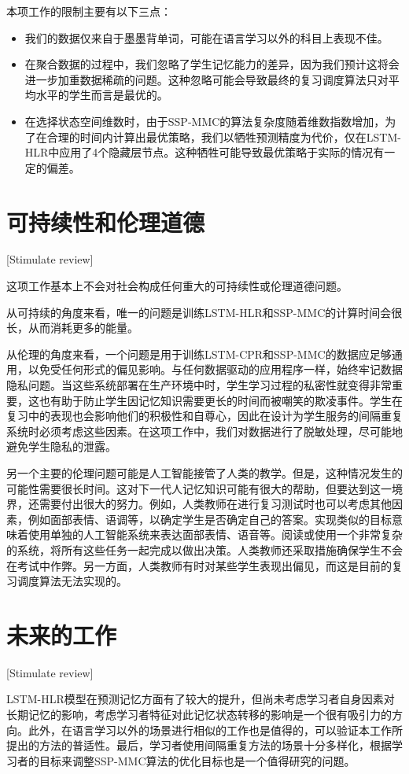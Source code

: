 本项工作的限制主要有以下三点：

\begin{itemize}
    \item 我们的数据仅来自于墨墨背单词，可能在语言学习以外的科目上表现不佳。
    \item 在聚合数据的过程中，我们忽略了学生记忆能力的差异，因为我们预计这将会进一步加重数据稀疏的问题。这种忽略可能会导致最终的复习调度算法只对平均水平的学生而言是最优的。
    \item 在选择状态空间维数时，由于SSP-MMC的算法复杂度随着维数指数增加，为了在合理的时间内计算出最优策略，我们以牺牲预测精度为代价，仅在LSTM-HLR中应用了4个隐藏层节点。这种牺牲可能导致最优策略于实际的情况有一定的偏差。
\end{itemize}

\section{可持续性和伦理道德}[Stimulate review]

这项工作基本上不会对社会构成任何重大的可持续性或伦理道德问题。

从可持续的角度来看，唯一的问题是训练LSTM-HLR和SSP-MMC的计算时间会很长，从而消耗更多的能量。

从伦理的角度来看，一个问题是用于训练LSTM-CPR和SSP-MMC的数据应足够通用，以免受任何形式的偏见影响。与任何数据驱动的应用程序一样，始终牢记数据隐私问题。当这些系统部署在生产环境中时，学生学习过程的私密性就变得非常重要，这也有助于防止学生因记忆知识需要更长的时间而被嘲笑的欺凌事件。学生在复习中的表现也会影响他们的积极性和自尊心，因此在设计为学生服务的间隔重复系统时必须考虑这些因素。在这项工作中，我们对数据进行了脱敏处理，尽可能地避免学生隐私的泄露。

另一个主要的伦理问题可能是人工智能接管了人类的教学。但是，这种情况发生的可能性需要很长时间。这对下一代人记忆知识可能有很大的帮助，但要达到这一境界，还需要付出很大的努力。例如，人类教师在进行复习测试时也可以考虑其他因素，例如面部表情、语调等，以确定学生是否确定自己的答案。实现类似的目标意味着使用单独的人工智能系统来表达面部表情、语音等。阅读或使用一个非常复杂的系统，将所有这些任务一起完成以做出决策。人类教师还采取措施确保学生不会在考试中作弊。另一方面，人类教师有时对某些学生表现出偏见，而这是目前的复习调度算法无法实现的。

\section{未来的工作}[Stimulate review]

LSTM-HLR模型在预测记忆方面有了较大的提升，但尚未考虑学习者自身因素对长期记忆的影响，考虑学习者特征对此记忆状态转移的影响是一个很有吸引力的方向。此外，在语言学习以外的场景进行相似的工作也是值得的，可以验证本工作所提出的方法的普适性。最后，学习者使用间隔重复方法的场景十分多样化，根据学习者的目标来调整SSP-MMC算法的优化目标也是一个值得研究的问题。

